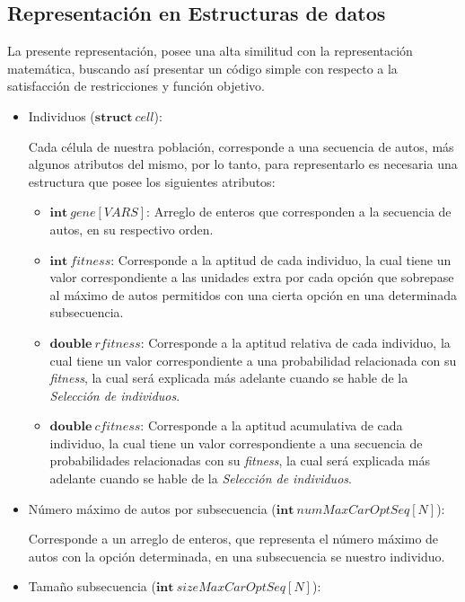 \subsection{Representación en Estructuras de datos}
La presente representación, posee una alta similitud con la representación matemática, buscando así presentar un código simple
con respecto a la satisfacción de restricciones y función objetivo.

\begin{itemize}
	\item Individuos ($\textbf{struct}\ cell$):
				
		Cada célula de nuestra población, corresponde a una secuencia de autos, más algunos atributos del mismo, por lo tanto,
		para representarlo es necesaria una estructura que posee los siguientes atributos:
		\begin{itemize}
			\item $\textbf{int}\ gene[VARS]$: Arreglo de enteros que corresponden  a la secuencia de autos, en su respectivo orden.
			\item $\textbf{int}\ fitness$: Corresponde a la aptitud de cada individuo, la cual tiene un valor correspondiente a las unidades
				extra por cada opción que sobrepase al máximo de autos permitidos con una cierta opción en una determinada subsecuencia.
			\item $\textbf{double}\ rfitness$: Corresponde a la aptitud relativa de cada individuo, la cual tiene un valor correspondiente
				a una probabilidad relacionada con su \emph{fitness}, la cual será explicada más adelante cuando se hable de la \emph{Selección de
				individuos}.
			\item $\textbf{double}\ cfitness$: Corresponde a la aptitud acumulativa de cada individuo, la cual tiene un valor correspondiente
				a una secuencia de probabilidades relacionadas con su \emph{fitness}, la cual será explicada más adelante cuando se hable de la \emph{Selección
				de individuos}.
		\end{itemize}

	\item Número máximo de autos por subsecuencia ($\textbf{int}\ numMaxCarOptSeq[N]$):
	
		Corresponde a un arreglo de enteros, que representa el número máximo de autos con la opción determinada, en una subsecuencia se nuestro individuo.


	\item Tamaño subsecuencia ($\textbf{int}\ sizeMaxCarOptSeq[N]$):


\end{itemize}
